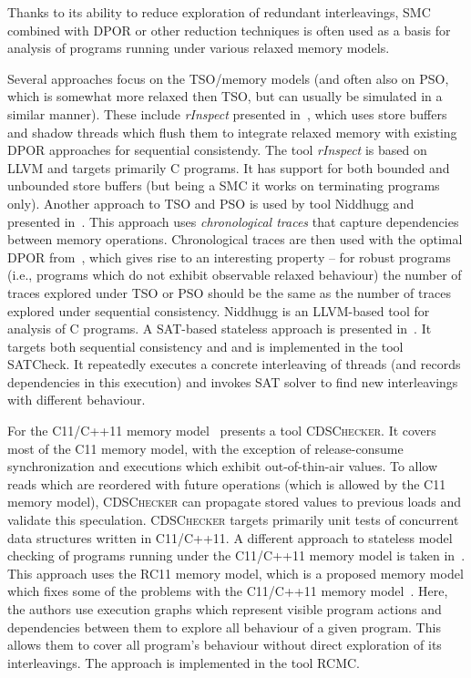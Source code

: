 
Thanks to its ability to reduce exploration of redundant interleavings, SMC
combined with DPOR or other reduction techniques is often used as a basis for
analysis of programs running under various relaxed memory models.

Several approaches focus on the TSO/\xtso memory models (and often also on PSO,
which is somewhat more relaxed then TSO, but can usually be simulated in a
similar manner).
These include \emph{rInspect} presented in~\cite{Zhang2015}, which uses store
buffers and shadow threads which flush them to integrate relaxed memory with
existing DPOR approaches for sequential consistendy.
The tool \emph{rInspect} is based on LLVM and targets primarily C programs.
It has support for both bounded and unbounded store buffers (but being a SMC it
works on terminating programs only).
Another approach to TSO and PSO is used by tool Niddhugg and presented
in~\cite{Abdulla2017}.
This approach uses \emph{chronological traces} that capture dependencies between
memory operations.
Chronological traces are then used with the optimal DPOR
from~\cite{Abdulla2014}, which gives rise to an interesting property -- for
robust programs (i.e., programs which do not exhibit observable relaxed
behaviour) the number of traces explored under TSO or PSO should be the same as
the number of traces explored under sequential consistency.
Niddhugg is an LLVM-based tool for analysis of C programs.
A SAT-based stateless approach is presented in~\cite{Demsky2015}.
It targets both sequential consistency and \xtso and is implemented in the tool
SATCheck.
It repeatedly executes a concrete interleaving of threads (and records
dependencies in this execution) and invokes SAT solver to find new
interleavings with different behaviour.

For the C11/C++11 memory model~\cite{Norris2013} presents a tool \textsc{CDSChecker}.
It covers most of the C11 memory model, with the exception of release-consume
synchronization and executions which exhibit out-of-thin-air
values.
To allow reads which are reordered with future operations (which is allowed by
the C11 memory model), \textsc{CDSChecker} can propagate stored values to
previous loads and validate this speculation.
\textsc{CDSChecker} targets primarily unit tests of concurrent data structures
written in C11/C++11.
A different approach to stateless model checking of programs running under the
C11/C++11 memory model is taken in~\cite{Kokologiannakis2017}.
This approach uses the RC11 memory model, which is a proposed memory model
which fixes some of the problems with the C11/C++11 memory
model~\cite{Lahav2017}.
Here, the authors use execution graphs which represent visible program actions
and dependencies between them to explore all behaviour of a given program.
This allows them to cover all program's behaviour without direct exploration of
its interleavings.
The approach is implemented in the tool RCMC.



